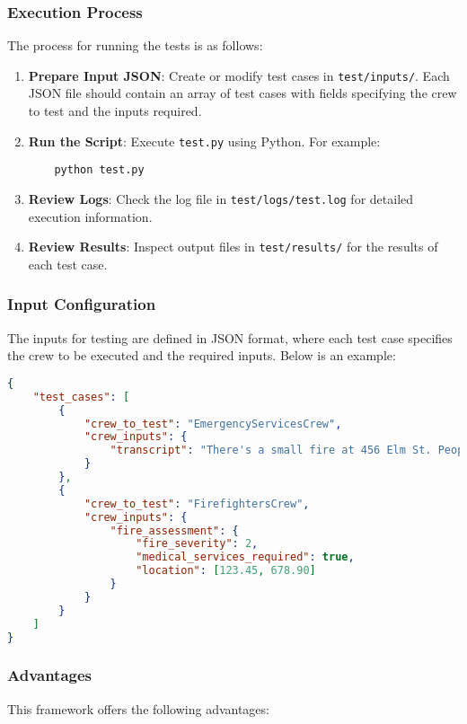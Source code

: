 \subsubsection*{Execution Process}
The process for running the tests is as follows:

\begin{enumerate}
    \item \textbf{Prepare Input JSON}: Create or modify test cases in \texttt{test/inputs/}. Each JSON file should contain an array of test cases with fields specifying the crew to test and the inputs required.
    \item \textbf{Run the Script}: Execute \texttt{test.py} using Python. For example:
    \begin{verbatim}
    python test.py
    \end{verbatim}
    \item \textbf{Review Logs}: Check the log file in \texttt{test/logs/test.log} for detailed execution information.
    \item \textbf{Review Results}: Inspect output files in \texttt{test/results/} for the results of each test case.
\end{enumerate}

\subsubsection*{Input Configuration}
The inputs for testing are defined in JSON format, where each test case specifies the crew to be executed and the required inputs. Below is an example:

\begin{lstlisting}[language=json, caption={Example Input JSON for Testing Crews}]
{
    "test_cases": [
        {
            "crew_to_test": "EmergencyServicesCrew",
            "crew_inputs": {
                "transcript": "There's a small fire at 456 Elm St. People might be trapped."
            }
        },
        {
            "crew_to_test": "FirefightersCrew",
            "crew_inputs": {
                "fire_assessment": {
                    "fire_severity": 2,
                    "medical_services_required": true,
                    "location": [123.45, 678.90]
                }
            }
        }        
    ]
}
\end{lstlisting}

\subsubsection*{Advantages}
This framework offers the following advantages:

